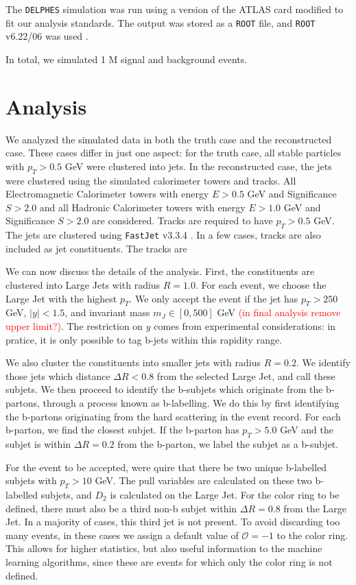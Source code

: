 \documentclass[10pt,a4paper]{book}
\newcommand\todo[1]{\textcolor{red}{#1}}
\def\code#1{\texttt{#1}}
\begin{document}
The \code{DELPHES} simulation was run using a version of the ATLAS card modified to fit our analysis standards. The output was stored as a \code{ROOT} file, and \code{ROOT} v6.22/06 was used \cite{fons_rademakers_2020_3895852}. 

In total, we simulated 1 M signal and background events.


\section{Analysis}

We analyzed the simulated data in both the truth case and the reconstructed case. These cases differ in just one aspect: for the truth case, all stable particles with $p_T > 0.5$ GeV were clustered into jets. In the reconstructed case, the jets were clustered using the simulated calorimeter towers and tracks. All Electromagnetic Calorimeter towers with energy $E > 0.5$ GeV and Significance $S > 2.0$ and all Hadronic Calorimeter towers with energy $E > 1.0$ GeV and Significance $S > 2.0$ are considered. Tracks are required to have $p_T > 0.5$ GeV. The jets are clustered using \code{FastJet} v3.3.4 \cite{Cacciari:2011ma}. In a few cases, tracks are also included as jet constituents. The tracks are 

We can now discuss the details of the analysis. First, the constituents are clustered into Large Jets with radius $R=1.0$.  For  each  event,  we  choose  the  Large  Jet  with  the highest $p_T$. We only accept the event if the jet has $p_T > 250$ GeV, $\vert y \vert < 1.5$, and invariant mass $m_J \in [0,500]$ GeV \todo{(in final analysis remove upper limit?)}. The restriction on $y$ comes from experimental considerations: in pratice, it is only possible to tag b-jets within this rapidity range.

We  also  cluster  the  constituents  into  smaller  jets with radius $R = 0.2$. We identify those jets which distance $\Delta R < 0.8$ from the selected Large Jet, and call these subjets. We then proceed to identify the b-subjets which originate from the b-partons, through a process known as b-labelling. We do this by first identifying the b-partons originating from the hard scattering in the event record. For each b-parton, we find the closest subjet. If the b-parton has $p_T > 5.0$ GeV and the subjet is within $\Delta R = 0.2$ from the b-parton, we label the subjet as a b-subjet. 

For the event to be accepted, were quire that there be two unique b-labelled subjets with $p_T > 10$ GeV. The pull variables are calculated on these two b-labelled subjets, and $D_2$ is calculated on the Large Jet. For the color ring to be defined, there must also be a third non-b subjet within $\Delta R = 0.8$ from the Large Jet. In a majority of cases, this third jet is not present. To avoid discarding too many events, in these cases we assign a default value of $\mathcal{O} = -1$ to the color ring. This allows for higher statistics, but also useful information to the machine learning algorithms, since these are events for which only the color ring is not defined.
\end{document}
